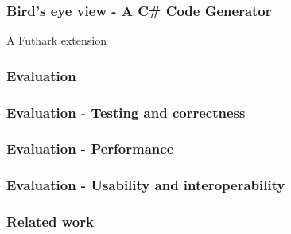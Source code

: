 \documentclass[10pt, compress]{beamer}
\begin{document}
\begin{frame}[plain]
\frametitle{Bird's eye view - A C\# Code Generator}
\begin{center}
  \Huge A Futhark extension
\end{center}
\end{frame}

\begin{frame}[fragile]
  \frametitle{Evaluation}
\end{frame}

\begin{frame}[fragile]
  \frametitle{Evaluation - Testing and correctness}

  


\end{frame}


\begin{frame}[fragile]
  \frametitle{Evaluation - Performance}






\end{frame}

\begin{frame}[fragile]
  \frametitle{Evaluation - Usability and interoperability}

  
\end{frame}

\begin{frame}[fragile]
  \frametitle{Related work}
\end{frame}

\end{document}
